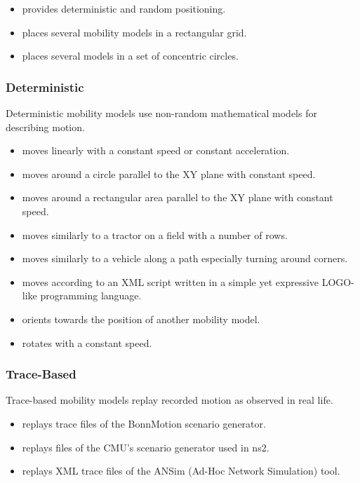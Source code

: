 \begin{itemize}
    \item {} provides deterministic and random positioning.
    \item {} places several mobility models in a rectangular grid.
    \item {} places several models in a set of concentric circles.
\end{itemize}

\subsubsection*{Deterministic}

Deterministic mobility models use non-random mathematical models for describing motion.

\begin{itemize}
    \item {} moves linearly with a constant speed or constant acceleration.
    \item {} moves around a circle parallel to the XY plane with constant speed.
    \item {} moves around a rectangular area parallel to the XY plane with constant speed.
    \item {} moves similarly to a tractor on a field with a number of rows.
    \item {} moves similarly to a vehicle along a path especially turning around corners.
    \item {} moves according to an XML script written in a simple yet expressive LOGO-like programming language.
    \item {} orients towards the position of another mobility model.
    \item {} rotates with a constant speed.
\end{itemize}

\subsubsection*{Trace-Based}

Trace-based mobility models replay recorded motion as observed in real life.

\begin{itemize}
    \item {} replays trace files of the BonnMotion scenario generator.
    \item {} replays files of the CMU's scenario generator used in ns2.
    \item {} replays XML trace files of the ANSim (Ad-Hoc Network Simulation) tool.
\end{itemize}


